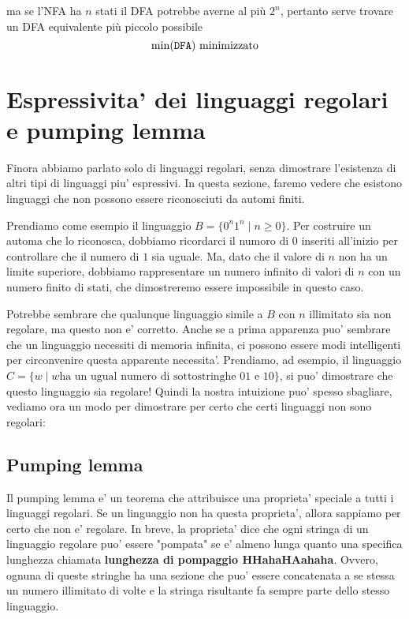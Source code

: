 ma se l'NFA ha $n$ stati il DFA potrebbe averne al più $2^n$, pertanto serve trovare un DFA equivalente più piccolo possibile
\[
    \min(\text{\texttt{DFA}}) \text{ minimizzato}
\] 

\section{Espressivita' dei linguaggi regolari e pumping lemma}
Finora abbiamo parlato solo di linguaggi regolari, senza dimostrare l'esistenza di altri tipi di linguaggi piu' espressivi. In questa sezione, faremo vedere che esistono linguaggi che non possono essere riconosciuti da automi finiti.

Prendiamo come esempio il linguaggio $ B = \{0^n 1^n \mid n \geq 0\} $. Per costruire un automa che lo riconosca, dobbiamo ricordarci il numoro di $ 0 $ inseriti all'inizio per controllare che il numero di $ 1 $ sia uguale. Ma, dato che il valore di $ n $ non ha un limite superiore, dobbiamo rappresentare un numero infinito di valori di $ n $ con un numero finito di stati, che dimostreremo essere impossibile in questo caso.

Potrebbe sembrare che qualunque linguaggio simile a $ B $ con $ n $ illimitato sia non regolare, ma questo non e' corretto. Anche se a prima apparenza puo' sembrare che un linguaggio necessiti di memoria infinita, ci possono essere modi intelligenti per circonvenire questa apparente necessita'. Prendiamo, ad esempio, il linguaggio $ C = \{w \mid w \text{ha un ugual numero di sottostringhe 01 e 10}\} $, si puo' dimostrare che questo linguaggio sia regolare! Quindi la nostra intuizione puo' spesso sbagliare, vediamo ora un modo per dimostrare per certo che certi linguaggi non sono regolari:

\subsection{Pumping lemma}
Il pumping lemma e' un teorema che attribuisce una proprieta' speciale a tutti i linguaggi regolari. Se un linguaggio non ha questa proprieta', allora sappiamo per certo che non e' regolare. In breve, la proprieta' dice che ogni stringa di un linguaggio regolare puo' essere "pompata" se e' almeno lunga quanto una specifica lunghezza chiamata \textbf{lunghezza di pompaggio HHahaHAahaha}. Ovvero, ognuna di queste stringhe ha una sezione che puo' essere concatenata a se stessa un numero illimitato di volte e la stringa risultante fa sempre parte dello stesso linguaggio. 


